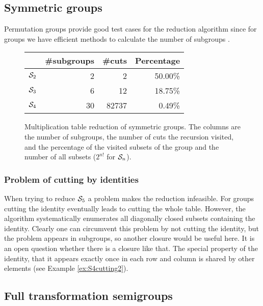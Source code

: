 \documentclass{article}
\theoremstyle{plain}
\theoremstyle{definition}
\newcommand{\cS}{{\cal S}}
\begin{document}
\subsection{Symmetric groups}

Permutation groups provide good test cases for the reduction algorithm since for groups we have efficient methods to calculate the number of subgroups \cite{CGTHandbook}.
\begin{figure}
\begin{center}
\begin{tabular}{|l|r|r|r|}
\hline
 & \#subgroups & \#cuts & Percentage\\
\hline
$\cS_2$ & 2 & 2 & 50.00\% \\
\hline
$\cS_3$ & 6 & 12 & 18.75\% \\
\hline
$\cS_4$ & 30 & 82737 & 0.49\% \\
\hline
\end{tabular}
\end{center}
\caption{Multiplication table reduction of symmetric groups. The columns are the number of subgroups, the number of cuts the recursion visited, and the percentage of the visited subsets of the group and the number of all subsets ($2^{n!}$ for $\cS_n$).}
\end{figure}

\subsubsection{Problem of cutting by identities}
When trying to reduce $\cS_5$ a problem makes the reduction infeasible. For groups  cutting the identity eventually leads to cutting the whole table. However, the algorithm systematically enumerates all diagonally closed subsets containing the identity. Clearly one can circumvent this problem by  not cutting the identity, but  the problem appears in subgroups, so another closure would be useful here. It is an open question whether there is a closure like that. The special property of the identity, that it appears exactly once in each row and column is shared by other elements (see Example \ref{ex:S4cutting2}).  

\subsection{Full transformation semigroups}
\end{document}
